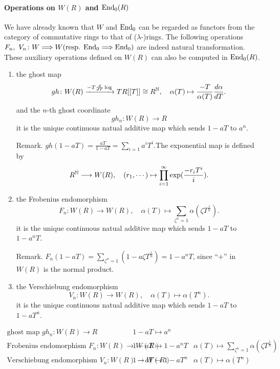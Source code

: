 \paragraph{Operations on $W(R)$ and $\mathrm{End}_0(R)$}
We have already known that $W$ and $\mathrm{End}_0$ can be regarded as functors from the category of commutative rings to that of ($\lambda$-)rings. The following operations $F_n,\  V_n \colon W \Longrightarrow W (\mbox{resp. }\mathrm{End}_0 \Longrightarrow \mathrm{End}_0) $ are indeed natural transformation.
These auxiliary operations defined on $W(R)$ can also be computed in $\mathrm{End}_0(R)$.
\begin{enumerate}
	\item the ghost map 
	\[gh \colon W(R) \xrightarrow{-T\frac{d}{dT}\log} TR[[T]] \cong R^{\mathbb{N}},\quad \alpha(T)\mapsto \frac{-T}{\alpha(T)} \frac{d\alpha}{d T}. \] 
	and  the $n$-th ghost coordinate 
	\[gh_n \colon W(R)\longrightarrow R\]
	it is the unique continuous natual additive map which sends $1-aT$ to $a^n$.

	Remark. $gh(1-aT)=\frac{aT}{1-aT}=\sum_{i=1} a^iT^i$.The exponential map is defined by
	\[R^{\mathbb{N}}\longrightarrow W(R),\quad (r_1,\cdots) \mapsto \prod_{i=1}^\infty \exp (\frac{-r_i T^i}{i}). \]
	

	\item the Frobenius endomorphism
	\[F_n \colon W(R)\longrightarrow W(R),\quad \alpha(T)\mapsto \sum_{\zeta^n=1}\alpha(\zeta T^{\frac{1}{n}}). \]
	it is the unique continuous natual additive map which sends $1-aT$ to $1-a^nT$.

	Remark. $F_n(1-aT)=\sum_{\zeta^n=1}(1-a\zeta T^{\frac{1}{n}})=1-a^nT $, since ``$+$'' in $W(R)$ is the normal product.

	\item the Verschiebung endomorphism
	\[V_n \colon W(R)\longrightarrow W(R),\quad \alpha(T)\mapsto \alpha(T^n). \]
	it is the unique continuous natual additive map which sends $1-aT$ to $1-aT^n$.
\end{enumerate}
\begin{equation*}
	\begin{array}{c|l|c}
	\mbox{ghost map } gh_n\colon W(R)\longrightarrow R & 1-aT \mapsto a^n & \\
	\hline
	\mbox{Frobenius endomorphism } F_n \colon W(R)\longrightarrow W(R)&  1-aT\mapsto 1-a^nT & \alpha(T)\mapsto \sum_{\zeta^n=1}\alpha(\zeta T^{\frac{1}{n}}) \\
	\hline
	\mbox{Verschiebung endomorphism }V_n \colon W(R)\longrightarrow W(R) &1-aT\mapsto 1-aT^n&\alpha(T)\mapsto \alpha(T^n)
\end{array}
\end{equation*}

